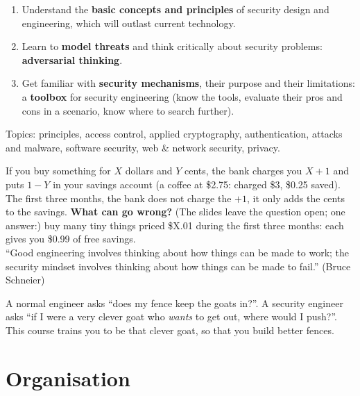 \begin{defnbox}[title=The three aims of the course]
\begin{enumerate}
  \item Understand the \textbf{basic concepts and principles} of security design and engineering,
        which will outlast current technology.
  \item Learn to \textbf{model threats} and think critically about security problems:
        \textbf{adversarial thinking}.
  \item Get familiar with \textbf{security mechanisms}, their purpose and their limitations: a
        \textbf{toolbox} for security engineering (know the tools, evaluate their pros and cons
        in a scenario, know where to search further).
\end{enumerate}
Topics: principles, access control, applied cryptography, authentication, attacks and malware,
software security, web \& network security, privacy.
\end{defnbox}

\begin{exbox}[title={The security mindset: ``Keep the change'' (Bank of America)}]
If you buy something for $X$ dollars and $Y$ cents, the bank charges you $X+1$ and puts $1-Y$ in
your savings account (a coffee at \$2.75: charged \$3, \$0.25 saved). The first three months, the
bank does not charge the $+1$, it only adds the cents to the savings. \textbf{What can go wrong?}
(The slides leave the question open; one answer:) buy many tiny things priced \$X.01 during the first three months: each gives you \$0.99 of free
savings. \\
``Good engineering involves thinking about how things can be made to work; the security mindset
involves thinking about how things can be made to fail.'' (Bruce Schneier)
\end{exbox}

\begin{goatbox}
A normal engineer asks ``does my fence keep the goats in?''. A security engineer asks ``if I were
a very clever goat who \emph{wants} to get out, where would I push?''. This course trains you to
be that clever goat, so that you build better fences.
\end{goatbox}

\section{Organisation}

